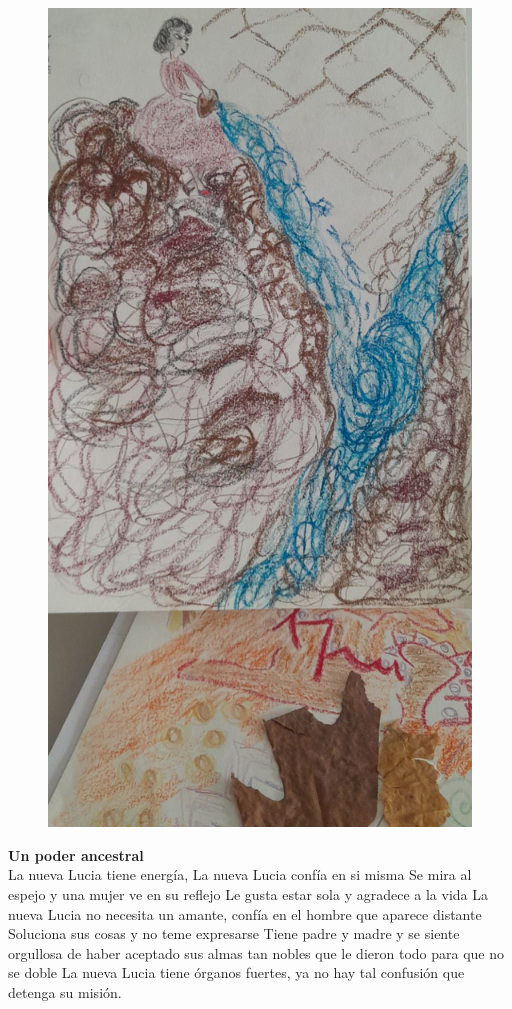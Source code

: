 \documentclass[12pt, a4paper, twoside]{book} %
\begin{document}
\begin{figure}[H]
	\centering
	\includegraphics[width=\textwidth]{./images/1f81324df13197.jpg}
\end{figure}

\noindent\textbf{Un poder ancestral}\\
La nueva Lucia tiene energía,
La nueva Lucia confía en si misma
Se mira al espejo y una mujer ve en su reflejo
Le gusta estar sola y agradece a la vida
La nueva Lucia no necesita un amante, confía en el hombre que aparece distante
Soluciona sus cosas y no teme expresarse
Tiene padre y madre y se siente orgullosa de haber aceptado sus almas tan nobles que le dieron todo para que no se doble
La nueva Lucia tiene órganos fuertes, ya no hay tal confusión que detenga su misión.
\end{document}
